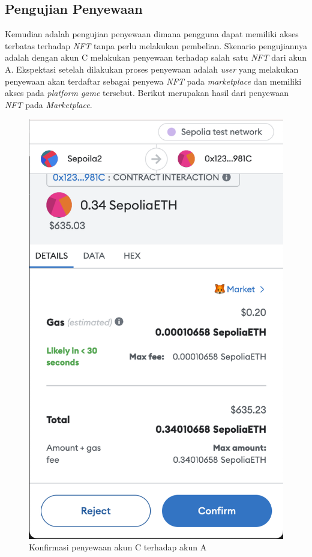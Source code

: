 \subsection{Pengujian Penyewaan}

Kemudian adalah pengujian penyewaan dimana pengguna dapat memiliki akses terbatas terhadap \emph{NFT} tanpa perlu melakukan pembelian. Skenario pengujiannya adalah dengan akun C melakukan penyewaan terhadap salah satu \emph{NFT} dari akun A. Ekspektasi setelah dilakukan proses penyewaan adalah \emph{user} yang melakukan penyewaan akan terdaftar sebagai penyewa \emph{NFT} pada \emph{marketplace} dan memiliki akses pada \emph{platform game} tersebut. Berikut merupakan hasil dari penyewaan \emph{NFT} pada \emph{Marketplace}.

  \begin{figure} [H] \centering
            \includegraphics[scale=0.2]{gambar/img-test-integration-rental-metamask-1.png}
            \caption{Konfirmasi penyewaan akun C terhadap akun A}
            \label{fig:TestIntegrationPurchaseMetamask1}
        \end{figure}


